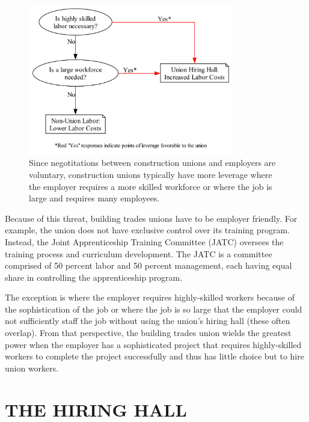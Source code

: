 \documentclass[12pt]{article}
\begin{document}
\begin{figure}[ht]
  \centering
  \includegraphics[width=0.8\textwidth]{images/union_power_red}
  \captionsetup{justification=centering, singlelinecheck=false, margin=2cm} 
  \caption{Since negotitations between construction unions and employers are voluntary, construction unions typically have more leverage where the employer requires a more skilled workforce or where the job is large and requires many employees.}
  \label{fig:union_power_red}
\end{figure}

Because of this threat, building trades unions have to be employer friendly. For example, the union does not have exclusive control over its training program. Instead, the Joint Apprenticeship Training Committee (JATC) oversees the training process and curriculum development. The JATC is a committee comprised of 50 percent labor and 50 percent management, each having equal share in controlling the apprenticeship program. 

The exception is where the employer requires highly-skilled workers because of the sophistication of the job or where the job is so large that the employer could not sufficiently staff the job without using the union's hiring hall (these often overlap). From that perspective, the building trades union wields the greatest power when the employer has a sophisticated project that requires highly-skilled workers to complete the project successfully and thus has little choice but to hire union workers. 

\section{THE HIRING HALL} \
\end{document}
